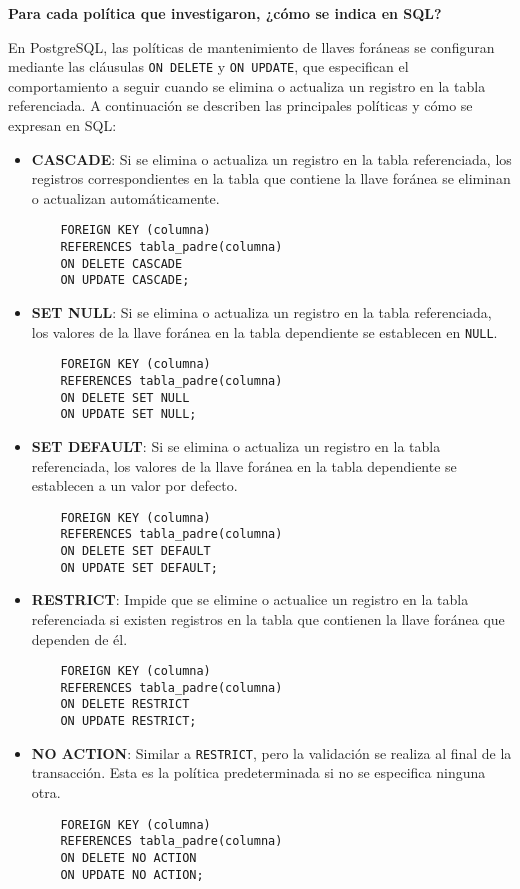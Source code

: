 \begin{center}
    \textbf{Para cada política que investigaron, ¿cómo se indica en SQL?}
\end{center}

En PostgreSQL, las políticas de mantenimiento de llaves foráneas se configuran mediante las cláusulas \texttt{ON DELETE} y \texttt{ON UPDATE}, que especifican el comportamiento a seguir cuando se elimina o actualiza un registro en la tabla referenciada. A continuación se describen las principales políticas y cómo se expresan en SQL:

\begin{itemize}
    \item \textbf{CASCADE}: Si se elimina o actualiza un registro en la tabla referenciada, los registros correspondientes en la tabla que contiene la llave foránea se eliminan o actualizan automáticamente.
    \begin{verbatim}
    FOREIGN KEY (columna)
    REFERENCES tabla_padre(columna)
    ON DELETE CASCADE
    ON UPDATE CASCADE;
    \end{verbatim}
    
    \item \textbf{SET NULL}: Si se elimina o actualiza un registro en la tabla referenciada, los valores de la llave foránea en la tabla dependiente se establecen en \texttt{NULL}.
    \begin{verbatim}
    FOREIGN KEY (columna)
    REFERENCES tabla_padre(columna)
    ON DELETE SET NULL
    ON UPDATE SET NULL;
    \end{verbatim}
    
    \item \textbf{SET DEFAULT}: Si se elimina o actualiza un registro en la tabla referenciada, los valores de la llave foránea en la tabla dependiente se establecen a un valor por defecto.
    \begin{verbatim}
    FOREIGN KEY (columna)
    REFERENCES tabla_padre(columna)
    ON DELETE SET DEFAULT
    ON UPDATE SET DEFAULT;
    \end{verbatim}
    
    \item \textbf{RESTRICT}: Impide que se elimine o actualice un registro en la tabla referenciada si existen registros en la tabla que contienen la llave foránea que dependen de él.
    \begin{verbatim}
    FOREIGN KEY (columna)
    REFERENCES tabla_padre(columna)
    ON DELETE RESTRICT
    ON UPDATE RESTRICT;
    \end{verbatim}
    
    \item \textbf{NO ACTION}: Similar a \texttt{RESTRICT}, pero la validación se realiza al final de la transacción. Esta es la política predeterminada si no se especifica ninguna otra.
    \begin{verbatim}
    FOREIGN KEY (columna)
    REFERENCES tabla_padre(columna)
    ON DELETE NO ACTION
    ON UPDATE NO ACTION;
    \end{verbatim}
\end{itemize}

